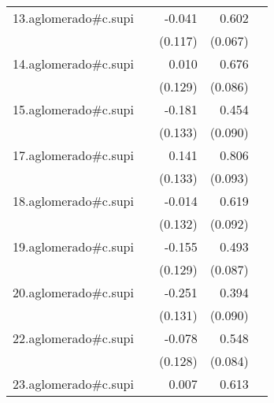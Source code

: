 {\begin{longtable}{l*{4}{D{.}{.}{-1}}}
\addlinespace
13.aglomerado#c.supi&                     &      -0.041         &       0.602\sym{***}&                     \\
            &                     &     (0.117)         &     (0.067)         &                     \\
\addlinespace
14.aglomerado#c.supi&                     &       0.010         &       0.676\sym{***}&                     \\
            &                     &     (0.129)         &     (0.086)         &                     \\
\addlinespace
15.aglomerado#c.supi&                     &      -0.181         &       0.454\sym{***}&                     \\
            &                     &     (0.133)         &     (0.090)         &                     \\
\addlinespace
17.aglomerado#c.supi&                     &       0.141         &       0.806\sym{***}&                     \\
            &                     &     (0.133)         &     (0.093)         &                     \\
\addlinespace
18.aglomerado#c.supi&                     &      -0.014         &       0.619\sym{***}&                     \\
            &                     &     (0.132)         &     (0.092)         &                     \\
\addlinespace
19.aglomerado#c.supi&                     &      -0.155         &       0.493\sym{***}&                     \\
            &                     &     (0.129)         &     (0.087)         &                     \\
\addlinespace
20.aglomerado#c.supi&                     &      -0.251         &       0.394\sym{***}&                     \\
            &                     &     (0.131)         &     (0.090)         &                     \\
\addlinespace
22.aglomerado#c.supi&                     &      -0.078         &       0.548\sym{***}&                     \\
            &                     &     (0.128)         &     (0.084)         &                     \\
\addlinespace
23.aglomerado#c.supi&                     &       0.007         &       0.613\sym{***}&                     \\

\end{longtable}}
